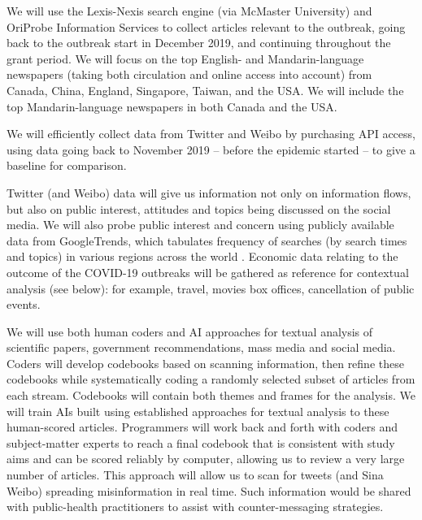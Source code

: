 
We will use the Lexis-Nexis search engine (via McMaster University) and OriProbe Information Services to collect articles relevant to the outbreak, going back to the outbreak start in December 2019, and continuing throughout the grant period. 
We will focus on the top English- and Mandarin-language newspapers (taking both circulation and online access into account) from 
Canada, China, England, Singapore, Taiwan, and the USA.
We will include the top Mandarin-language newspapers in both Canada and the USA.

We will efficiently collect data from Twitter and Weibo by purchasing API access, using data going back to November 2019 -- before the epidemic started -- to give a baseline for comparison. 

Twitter (and Weibo)  data will give us information not only on information flows, but also on public interest, attitudes and topics being discussed on the social media. We will also probe public interest and concern using publicly available data from GoogleTrends, which tabulates frequency of searches (by search times and topics) in various regions across the world \cite{BousAgac17, MahrBrag19}.
Economic data relating to the outcome of the COVID-19 outbreaks will be gathered as reference for contextual analysis (see below): for example, travel, movies box offices, cancellation of public events.



We will use both human coders and AI approaches for textual analysis of scientific papers, government recommendations, mass media and social media. Coders will develop codebooks based on scanning information, then refine these codebooks while systematically coding a randomly selected subset of articles from each stream. Codebooks will contain both themes and frames for the analysis.  We will train AIs built using established approaches for textual analysis to these human-scored articles. Programmers will work back and forth with coders and subject-matter experts to reach a final codebook that is consistent with study aims and can be scored reliably by computer, allowing us to review a very large number of articles.  
This approach will allow us to scan for tweets (and Sina Weibo) spreading misinformation in real time. Such information would be shared with public-health practitioners to assist with counter-messaging strategies.


